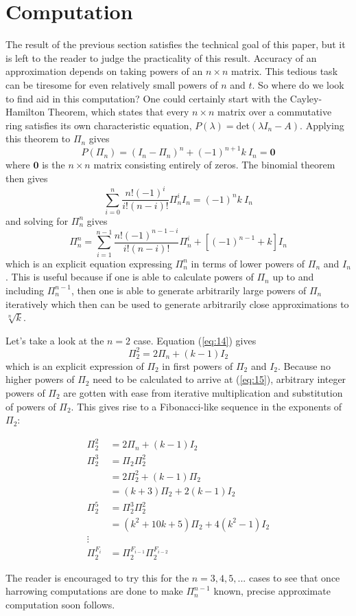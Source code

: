 \documentclass[11pt]{article}
\theoremstyle{plain}
\theoremstyle{definition}
\begin{document}
\section{Computation}
The result of the previous section satisfies the technical goal of this paper, but it is left to the reader to judge the practicality of this result. Accuracy of an approximation depends on taking powers of an $n\times n$ matrix. This tedious task can be tiresome for even relatively small powers of $n$ and $t$. So where do we look to find aid in this computation? One could certainly start with the Cayley-Hamilton Theorem, which states that every $n\times n$ matrix over a commutative ring satisfies its own characteristic equation, $P(\lambda)=$det$(\lambda \textit{I}_n-A).$ Applying this theorem to $\Pi_n$ gives $$P(\Pi_n)=(I_n-\Pi_n)^n + (-1)^{n+1} k \ I_n=\mathbf{0}$$ where $\textbf{0}$ is the $n\times n$ matrix consisting entirely of zeros. The binomial theorem then gives $$\sum_{i=0}^n \frac{n!(-1)^i}{i!(n-i)!}\Pi_n^i I_n = (-1)^n k\ I_n$$ and solving for $\Pi_n^n$ gives
\begin{equation}\label{eq:14}
\Pi_n^n=\sum_{i=1}^{n-1} \frac{n!(-1)^{n-1-i}}{i!(n-i)!}\Pi_n^i +\left[(-1)^{n-1}+k\right]I_n
\end{equation}
which is an explicit equation expressing $\Pi_n^n$ in terms of lower powers of $\Pi_n$ and $\textit{I}_n$. This is useful because if one is able to calculate powers of $\Pi_n$ up to and including $\Pi_n^{n-1}$, then one is able to generate arbitrarily large powers of $\Pi_n$ iteratively which then can be used to generate arbitrarily close approximations  to $\sqrt[n]{k}$.
\newline

Let's take a look at the $n=2$ case. Equation (\ref{eq:14}) gives
\begin{equation}\label{eq:15}
\Pi_2^2=2\Pi_n+(k-1)\textit{I}_2
\end{equation}
which is an explicit expression of $\Pi_2$ in first powers of $\Pi_2$ and $\textit{I}_2$. Because no higher powers of $\Pi_2$ need to be calculated to arrive at (\ref{eq:15}), arbitrary integer powers of $\Pi_2$ are gotten with ease from iterative multiplication and substitution of powers of $\Pi_2$. This gives rise to a Fibonacci-like sequence in the exponents of $\Pi_2$:

\begin{equation*}\begin{split}
\Pi_2^2 &=2\Pi_n+(k-1)\textit{I}_2\\
\Pi_2^3  &= \Pi_2 \Pi_2^2 \\
&= 2\Pi_2^2 + (k-1)\Pi_2\\
&= (k+3)\Pi_2+2(k-1)\textit{I}_2\\
\Pi_2^5  &= \Pi_2^3 \Pi_2^2 \\
&= (k^2+10k+5)\Pi_2+4(k^2-1)\textit{I}_2\\
\vdots & \\
\Pi_2^{F_i} &= \Pi_2^{F_{i-1}} \Pi_2^{F_{i-2}}\end{split}
\end{equation*}

 The reader is encouraged to try this for the $n=3,4,5,...$ cases to see that once harrowing computations are done to make $\Pi_n^{n-1}$  known, precise approximate computation soon follows.
\end{document}
